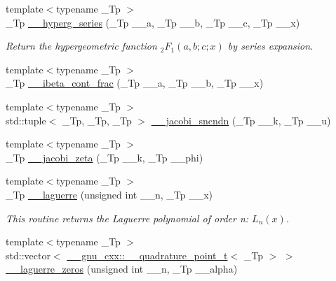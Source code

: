 \begin{DoxyCompactItemize}
{\footnotesize template$<$typename \+\_\+\+Tp $>$ }\\\+\_\+\+Tp \hyperlink{namespacestd_1_1____detail_ad234e0d31f55cd3748169dccb2533c6a}{\+\_\+\+\_\+hyperg\+\_\+series} (\+\_\+\+Tp \+\_\+\+\_\+a, \+\_\+\+Tp \+\_\+\+\_\+b, \+\_\+\+Tp \+\_\+\+\_\+c, \+\_\+\+Tp \+\_\+\+\_\+x)
\begin{DoxyCompactList}\small\item\em Return the hypergeometric function $ {}_2F_1(a,b;c;x) $ by series expansion. \end{DoxyCompactList}\item 
{\footnotesize template$<$typename \+\_\+\+Tp $>$ }\\\+\_\+\+Tp \hyperlink{namespacestd_1_1____detail_a96a5a5205553de07f98b89b2e1f18000}{\+\_\+\+\_\+ibeta\+\_\+cont\+\_\+frac} (\+\_\+\+Tp \+\_\+\+\_\+a, \+\_\+\+Tp \+\_\+\+\_\+b, \+\_\+\+Tp \+\_\+\+\_\+x)
\item 
{\footnotesize template$<$typename \+\_\+\+Tp $>$ }\\std\+::tuple$<$ \+\_\+\+Tp, \+\_\+\+Tp, \+\_\+\+Tp $>$ \hyperlink{namespacestd_1_1____detail_a98915d9bbc58112db7ffef2753313a63}{\+\_\+\+\_\+jacobi\+\_\+sncndn} (\+\_\+\+Tp \+\_\+\+\_\+k, \+\_\+\+Tp \+\_\+\+\_\+u)
\item 
{\footnotesize template$<$typename \+\_\+\+Tp $>$ }\\\+\_\+\+Tp \hyperlink{namespacestd_1_1____detail_a1d5fc69202703d72974c4370fd7ade03}{\+\_\+\+\_\+jacobi\+\_\+zeta} (\+\_\+\+Tp \+\_\+\+\_\+k, \+\_\+\+Tp \+\_\+\+\_\+phi)
\item 
{\footnotesize template$<$typename \+\_\+\+Tp $>$ }\\\+\_\+\+Tp \hyperlink{namespacestd_1_1____detail_aa714c4983a3cb7d9d18e0c2c5a8f6826}{\+\_\+\+\_\+laguerre} (unsigned int \+\_\+\+\_\+n, \+\_\+\+Tp \+\_\+\+\_\+x)
\begin{DoxyCompactList}\small\item\em This routine returns the Laguerre polynomial of order n\+: $ L_n(x) $. \end{DoxyCompactList}\item 
{\footnotesize template$<$typename \+\_\+\+Tp $>$ }\\std\+::vector$<$ \hyperlink{struct____gnu__cxx_1_1____quadrature__point__t}{\+\_\+\+\_\+gnu\+\_\+cxx\+::\+\_\+\+\_\+quadrature\+\_\+point\+\_\+t}$<$ \+\_\+\+Tp $>$ $>$ \hyperlink{namespacestd_1_1____detail_a2ac0c234cc7e41aed4ded7a7c5198130}{\+\_\+\+\_\+laguerre\+\_\+zeros} (unsigned int \+\_\+\+\_\+n, \+\_\+\+Tp \+\_\+\+\_\+alpha)
\item 

\end{DoxyCompactItemize}
